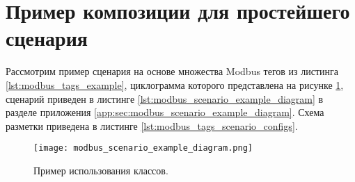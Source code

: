\clearpage\section{Пример композиции для простейшего сценария}

Рассмотрим пример сценария на основе множества Modbus тегов из листинга \ref{lst:modbus_tags_example},
циклограмма которого представлена на рисунке \ref{fig:modbus_scenario_example_diagram},
сценарий приведен в листинге \ref{lst:modbus_scenario_example_diagram} в разделе приложения \ref{app:sec:modbus_scenario_example_diagram}.
Схема разметки приведена в листинге \ref{lst:modbus_tags_scenario_configs}.

    \begin{figure}[hb!]\begin{center}
    \texttt{[image: modbus\_scenario\_example\_diagram.png]}
        \caption{Пример использования классов.}
            \label{fig:modbus_scenario_example_diagram}
\end{center}\end{figure}
